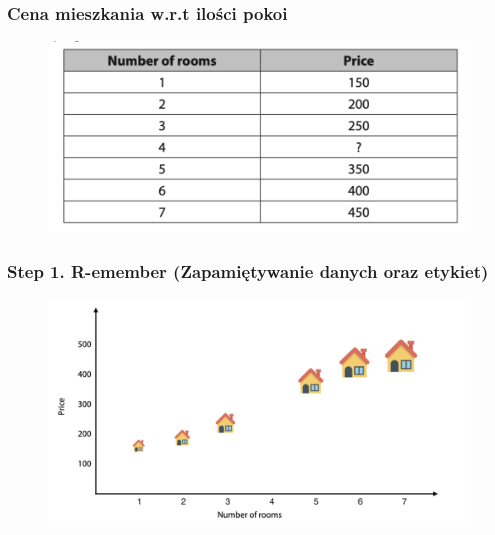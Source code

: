 \documentclass[smaller]{beamer}
\begin{document}

\begin{frame}
\frametitle{Cena mieszkania w.r.t ilości pokoi}
\begin{figure}
    \centering
    \includegraphics[width=\textwidth,height=0.7\textheight,keepaspectratio]{../manifest/estate-data-raw.png}
\end{figure}
\end{frame}


\begin{frame}
\frametitle{Step 1. R-emember (Zapamiętywanie danych oraz etykiet)}
\begin{figure}
    \centering
    \includegraphics[width=\textwidth,height=0.7\textheight,keepaspectratio]{../manifest/estate-remember.png}
\end{figure}
\end{frame}

\end{document}
